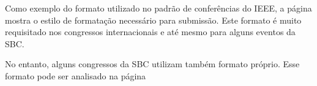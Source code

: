 Como exemplo do formato utilizado no padrão de conferências do IEEE, a página \pageref{IEEE} mostra o estilo de formatação necessário para submissão. Este formato é muito requisitado nos congressos internacionais e até mesmo para alguns eventos da SBC.

No entanto, alguns congressos da SBC utilizam também formato próprio. Esse formato pode ser analisado na página \pageref{SBC}

\label{IEEE}
\label{SBC}


